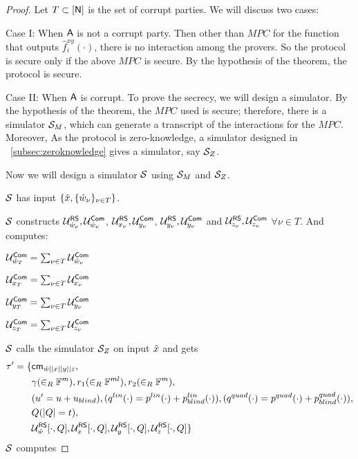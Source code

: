 \begin{proof}
	Let $T\subset [\mathsf{N}]$ is the set of corrupt parties.
	We will discuss two cases: 
	
	Case I: When $\mathsf{A}$ is not a corrupt party.
	Then other than $MPC$ for the function that outputs $\hat{f}^{xy}_i(\cdot)$, there is no interaction among the provers. So the protocol is secure only if the above $MPC$ is secure. By the hypothesis of the theorem, the protocol is secure.
	
	Case II: When $\mathsf{A}$ is corrupt.
	To prove the secrecy, we will design a simulator. 
	By the hypothesis of the theorem, the $MPC$ used is secure; therefore, there is a simulator $\mathcal{S}_{M}$, which can generate a transcript of the interactions for the $MPC$.
	Moreover, As the protocol is zero-knowledge, a simulator designed in ~\ref{subsec:zeroknowledge} gives a simulator, say $\mathcal{S}_{Z}$.
	
	Now we will design a simulator $\mathcal{S}$ using $\mathcal{S}_{M}$ and $\mathcal{S}_{Z}$.
	
	$\mathcal{S}$ has input $\{\hat{x}, \{\hat{w}_{\nu}\}_{\nu \in T}\}$.
	
	$\mathcal{S}$ constructs $\mathcal{U}^{\mathsf{RS}}_{\hat{w}_{\nu}}, \mathcal{U}^{\mathsf{Com}}_{\hat{w}_{\nu}}$, $\mathcal{U}^{\mathsf{RS}}_{x_{\nu}}, \mathcal{U}^{\mathsf{Com}}_{y_{\nu}}$, $\mathcal{U}^{\mathsf{RS}}_{y_{\nu}}, \mathcal{U}^{\mathsf{Com}}_{y_{\nu}}$ and $\mathcal{U}^{\mathsf{RS}}_{z_{\nu}}, \mathcal{U}^{\mathsf{Com}}_{z_{\nu}}$ $\forall \nu\in T$.
	And computes:
	
	$\mathcal{U}^{\mathsf{Com}}_{\hat{w}_{T}} = \sum_{\nu \in T} \mathcal{U}^{\mathsf{Com}}_{\hat{w}_{\nu}}$
	
	$\mathcal{U}^{\mathsf{Com}}_{x_{T}} = \sum_{\nu \in T} \mathcal{U}^{\mathsf{Com}}_{x_{\nu}}$
	
	$\mathcal{U}^{\mathsf{Com}}_{y_{T}} = \sum_{\nu \in T} \mathcal{U}^{\mathsf{Com}}_{y_{\nu}}$
	
	$\mathcal{U}^{\mathsf{Com}}_{z_{T}} = \sum_{\nu \in T} \mathcal{U}^{\mathsf{Com}}_{z_{\nu}}$
	
	$\mathcal{S}$ calls the simulator $\mathcal{S}_{Z}$ on input $\hat{x}$ and gets 
	\begin{align*}
	\tau' = \{
	& \mathsf{cm}_{\hat{w}||x||y||z},\\
	& \gamma(\in_R \mathbb{F}^{m}), r_1(\in_R \mathbb{F}^{ml}), r_2(\in_R \mathbb{F}^m), \\ 
	& (u' = u+u_{blind}), (q^{lin}(\cdot) = p^{lin}(\cdot)+p^{lin}_{blind}(\cdot)), (q^{quad}(\cdot) = p^{quad}(\cdot) + p^{quad}_{blind}(\cdot)),\\
	& Q (|Q|=t),\\
	& \mathcal{U}^{\mathsf{RS}}_{\hat{w}}[\cdot, Q], \mathcal{U}^{\mathsf{RS}}_{x}[\cdot, Q], \mathcal{U}^{\mathsf{RS}}_{y}[\cdot, Q], \mathcal{U}^{\mathsf{RS}}_{z}[\cdot, Q]
	\}
	\end{align*}
	$\mathcal{S}$ computes 
	

\end{proof}
